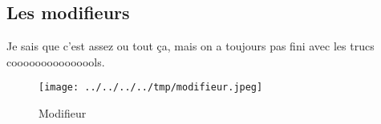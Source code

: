 %   


\subsection{Les modifieurs}

Je sais que c'est assez ou tout ça, mais on a toujours pas fini avec les trucs cooooooooooooools.



\begin{figure}
  \centering
  \texttt{[image: ../../../../tmp/modifieur.jpeg]}
  \caption{Modifieur}
  \label{fig:methode_modifieur}
\end{figure}



